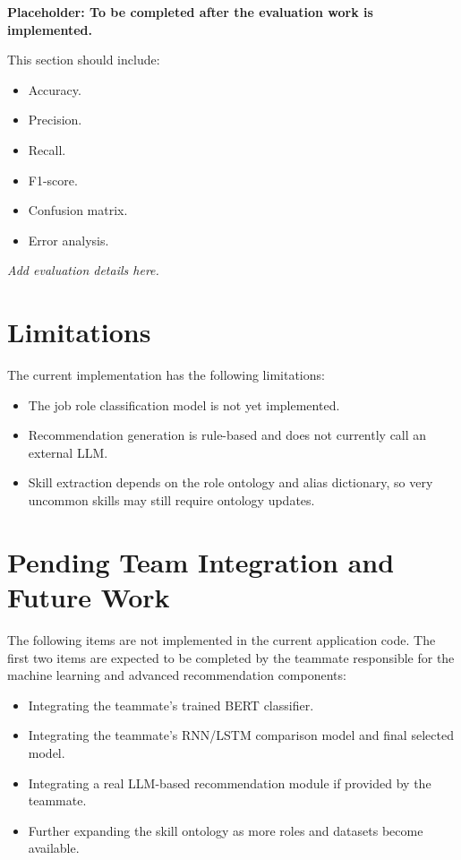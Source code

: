 \documentclass[12pt,a4paper]{article}
\begin{document}
\textbf{Placeholder: To be completed after the evaluation work is implemented.}

This section should include:

\begin{itemize}
    \item Accuracy.
    \item Precision.
    \item Recall.
    \item F1-score.
    \item Confusion matrix.
    \item Error analysis.
\end{itemize}

\vspace{2cm}
\noindent\textit{Add evaluation details here.}

\section{Limitations}

The current implementation has the following limitations:

\begin{itemize}
    \item The job role classification model is not yet implemented.
    \item Recommendation generation is rule-based and does not currently call an external LLM.
    \item Skill extraction depends on the role ontology and alias dictionary, so very uncommon skills may still require ontology updates.
\end{itemize}

\section{Pending Team Integration and Future Work}

The following items are not implemented in the current application code. The first two items are expected to be completed by the teammate responsible for the machine learning and advanced recommendation components:

\begin{itemize}
    \item Integrating the teammate's trained BERT classifier.
    \item Integrating the teammate's RNN/LSTM comparison model and final selected model.
    \item Integrating a real LLM-based recommendation module if provided by the teammate.
    \item Further expanding the skill ontology as more roles and datasets become available.
\end{itemize}
\end{document}
